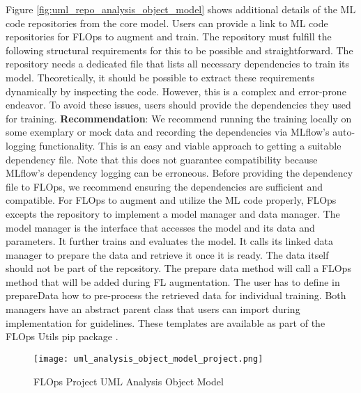 Figure \ref{fig:uml_repo_analysis_object_model} shows additional details of the ML code repositories from the core model.
Users can provide a link to ML code repositories for FLOps to augment and train.
The repository must fulfill the following structural requirements for this to be possible and straightforward.
The repository needs a dedicated file that lists all necessary dependencies to train its model.
Theoretically, it should be possible to extract these requirements dynamically by inspecting the code.
However, this is a complex and error-prone endeavor.
To avoid these issues, users should provide the dependencies they used for training.
\vspace{5mm}
\newline
\textbf{Recommendation}: We recommend running the training locally on some exemplary or mock data and recording the dependencies via MLflow's auto-logging functionality.
This is an easy and viable approach to getting a suitable dependency file.
Note that this does not guarantee compatibility because MLflow's dependency logging can be erroneous.
Before providing the dependency file to FLOps, we recommend ensuring the dependencies are sufficient and compatible.
\vspace{5mm}
\newline
For FLOps to augment and utilize the ML code properly, FLOps excepts the repository to implement a model manager and data manager.
The model manager is the interface that accesses the model and its data and parameters.
It further trains and evaluates the model.
It calls its linked data manager to prepare the data and retrieve it once it is ready.
The data itself should not be part of the repository.
The prepare data method will call a FLOps method that will be added during FL augmentation.
The user has to define in prepareData how to pre-process the retrieved data for individual training.
Both managers have an abstract parent class that users can import during implementation for guidelines.
These templates are available as part of the FLOps Utils pip package \cite{flops_utils_pip}.

\begin{figure}[h]
    \centering
    \texttt{[image: uml\_analysis\_object\_model\_project.png]}
    \caption{FLOps Project UML Analysis Object Model}
    \label{fig:uml_project_analysis_object_model}
\end{figure}

